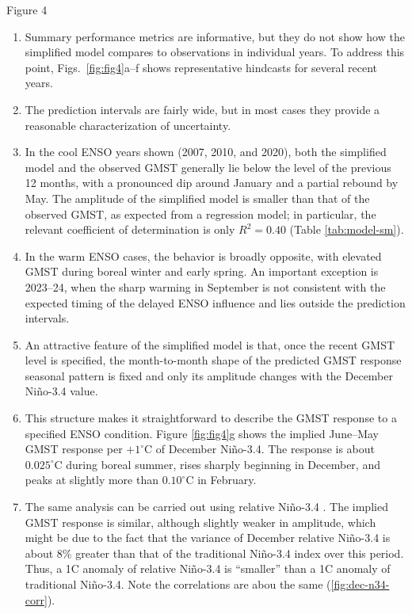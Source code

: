 \documentclass[aspectratio=169,xcolor=dvipsnames]{beamer}
\begin{document}
\begin{frame}{Figure 4}  
  \begin{enumerate}\tiny
  \item Summary performance metrics are informative, but they do not
    show how the simplified model compares to observations in
    individual years.  To address this point, Figs.\
    \ref{fig:fig4}a--f shows representative hindcasts for several
    recent years.

\item The prediction intervals are fairly wide, but in most cases
  they provide a reasonable characterization of uncertainty.

\item In the cool ENSO years shown (2007, 2010, and 2020), both
  the simplified model and the observed GMST generally lie below
  the level of the previous 12 months, with a pronounced dip
  around January and a partial rebound by May. The amplitude of
  the simplified model is smaller than that of the observed GMST,
  as expected from a regression model; in particular, the
  relevant coefficient of determination is only $R^2=0.40$
  (Table \ref{tab:model-sm}).

\item In the warm ENSO cases, the behavior is broadly opposite,
  with elevated GMST during boreal winter and early spring.
  An important exception is 2023--24, when the sharp warming in
  September is not consistent with the expected timing of the
  delayed ENSO influence and lies outside the prediction
  intervals.

\item An attractive feature of the simplified model is that, once the
  recent GMST level is specified, the month-to-month shape of the
  predicted GMST response seasonal pattern is fixed and only its
  amplitude changes with the December Ni\~no-3.4 value.

\item This structure makes it straightforward to describe the GMST
  response to a specified ENSO condition. Figure \ref{fig:fig4}g
  shows the implied June--May GMST response per
  $+1^\circ$C of December Ni\~no-3.4. The response is about
  $0.025^\circ$C during boreal summer, rises sharply beginning in
  December, and peaks at slightly more than $0.10^\circ$C in
  February.

\item The same analysis can be carried out using relative Ni\~no-3.4
  \citep{LHeureux2024relative}. The implied GMST response is similar,
  although slightly weaker in amplitude, which might be due to the
  fact that the variance of December relative Ni\~no-3.4 is about 8\%
  greater than that of the traditional Ni\~no-3.4 index over this
  period. Thus, a 1\textdegree C anomaly of relative Ni\~no-3.4 is
  ``smaller'' than a 1\textdegree C anomaly of traditional
  Ni\~no-3.4. Note the correlations are abou the same
  (\ref{fig:dec-n34-corr}).
  

\end{enumerate}
\end{frame}
\end{document}
